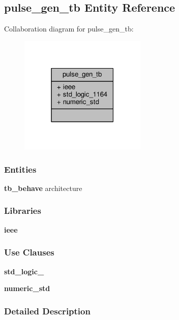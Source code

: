 \subsection{pulse\+\_\+gen\+\_\+tb Entity Reference}
\label{classpulse__gen__tb}


Collaboration diagram for pulse\+\_\+gen\+\_\+tb\+:\nopagebreak
\begin{figure}[H]
\begin{center}
\leavevmode
\includegraphics[width=171pt]{d1/d2e/classpulse__gen__tb__coll__graph}
\end{center}
\end{figure}
\subsubsection*{Entities}
\begin{DoxyCompactItemize}
\item 
{\bf tb\+\_\+behave} architecture
\end{DoxyCompactItemize}
\subsubsection*{Libraries}
 \begin{DoxyCompactItemize}
\item 
{\bf ieee} 
\end{DoxyCompactItemize}
\subsubsection*{Use Clauses}
 \begin{DoxyCompactItemize}
\item 
{\bf std\+\_\+logic\+\_}   
\item 
{\bf numeric\+\_\+std}   
\end{DoxyCompactItemize}


\subsubsection{Detailed Description}


